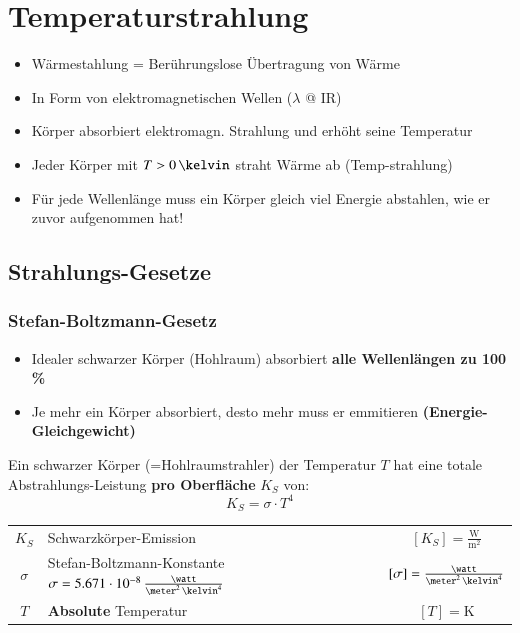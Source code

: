 \section{Temperaturstrahlung}

\begin{itemize}
	\item Wärmestahlung = Berührungslose Übertragung von Wärme 
	\item In Form von elektromagnetischen Wellen ($\lambda$ @ IR)
	\item Körper absorbiert elektromagn. Strahlung und erhöht seine Temperatur
	\item Jeder Körper mit $T > 0 \, \kelvin$ straht Wärme ab (Temp-strahlung)
	\item Für jede Wellenlänge muss ein Körper gleich viel Energie abstahlen, wie er zuvor aufgenommen hat!
\end{itemize}


\columnbreak

\subsection{Strahlungs-Gesetze}

\subsubsection{Stefan-Boltzmann-Gesetz}

\begin{itemize}
	\item Idealer schwarzer Körper (Hohlraum) absorbiert \textbf{alle Wellenlängen zu 100 \%}
	\item Je mehr ein Körper absorbiert, desto mehr muss er emmitieren \textbf{(Energie-Gleichgewicht)}
\end{itemize}


Ein schwarzer Körper (=Hohlraumstrahler) der Temperatur $T$ hat eine totale Abstrahlungs-Leistung \textbf{pro Oberfläche} $K_S$ von: 
$$ \boxed{ K_S = \sigma \cdot T^4 }  $$


\renewcommand{\arraystretch}{1.3}
\begin{tabular}{c l c}
	$K_S$ 		& Schwarzkörper-Emission 																			& $[K_S] = \mathrm{\frac{W}{m^2}}$ 					\\
	$\sigma$ 	& Stefan-Boltzmann-Konstante $\sigma = 5.671 \cdot 10^{-8} \, \frac{\watt}{\meter^2 \, \kelvin^4}$ 	& $[\sigma] = \frac{\watt}{\meter^2 \, \kelvin^4}$	\\
	$T$ 		& \textbf{Absolute} Temperatur 																		& $[T] = \mathrm{K}$
\end{tabular}
\renewcommand{\arraystretch}{1}


